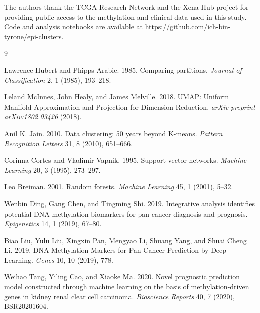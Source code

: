 \documentclass[sigconf]{acmart}
\begin{document}
\begin{acks}
The authors thank the TCGA Research Network and the Xena Hub project for providing public access to the methylation and clinical data used in this study. Code and analysis notebooks are available at \url{https://github.com/ich-bin-tyrone/epi-clusters}.
\end{acks}

\begin{thebibliography}{9}

Lawrence Hubert and Phipps Arabie. 1985.
\newblock Comparing partitions.
\newblock \emph{Journal of Classification} 2, 1 (1985), 193--218.

Leland McInnes, John Healy, and James Melville. 2018.
\newblock UMAP: Uniform Manifold Approximation and Projection for Dimension Reduction.
\newblock \emph{arXiv preprint arXiv:1802.03426} (2018).

Anil K. Jain. 2010.
\newblock Data clustering: 50 years beyond K-means.
\newblock \emph{Pattern Recognition Letters} 31, 8 (2010), 651--666.

Corinna Cortes and Vladimir Vapnik. 1995.
\newblock Support-vector networks.
\newblock \emph{Machine Learning} 20, 3 (1995), 273--297.

Leo Breiman. 2001.
\newblock Random forests.
\newblock \emph{Machine Learning} 45, 1 (2001), 5--32.

Wenbin Ding, Gang Chen, and Tingming Shi. 2019.
\newblock Integrative analysis identifies potential DNA methylation biomarkers for pan-cancer diagnosis and prognosis.
\newblock \emph{Epigenetics} 14, 1 (2019), 67--80.

Biao Liu, Yulu Liu, Xingxin Pan, Mengyao Li, Shuang Yang, and Shuai Cheng Li. 2019.
\newblock DNA Methylation Markers for Pan-Cancer Prediction by Deep Learning.
\newblock \emph{Genes} 10, 10 (2019), 778.

Weihao Tang, Yiling Cao, and Xiaoke Ma. 2020.
\newblock Novel prognostic prediction model constructed through machine learning on the basis of methylation-driven genes in kidney renal clear cell carcinoma.
\newblock \emph{Bioscience Reports} 40, 7 (2020), BSR20201604.

\end{thebibliography}
\end{document}
